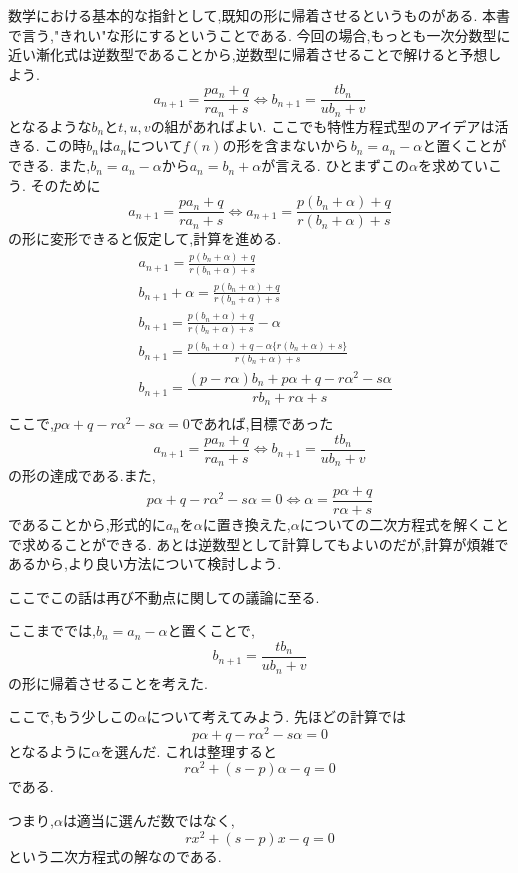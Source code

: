     数学における基本的な指針として,既知の形に帰着させるというものがある.
    本書で言う,"きれい"な形にするということである.
    今回の場合,もっとも一次分数型に近い漸化式は逆数型であることから,逆数型に帰着させることで解けると予想しよう.
    \[
      a_{n+1}=\frac{pa_n+q}{ra_n+s} \Leftrightarrow b_{n+1}=\frac{tb_n}{u b_n+v} 
    \]
    となるような$b_n$と$t,u,v$の組があればよい.
    ここでも特性方程式型のアイデアは活きる.
    この時$b_n$は$a_n$について$f(n)$の形を含まないから\,$b_n=a_n-\alpha$と置くことができる. 
    また,$b_n=a_n-\alpha$から$a_n=b_n+\alpha$が言える.
    ひとまずこの$\alpha$を求めていこう.
    そのために
    \[
      a_{n+1}=\frac{pa_n+q}{ra_n+s} \Leftrightarrow a_{n+1}=\frac{p(b_n+\alpha)+q}{r(b_n+\alpha)+s}
    \]
    の形に変形できると仮定して,計算を進める.
    \begin{align*}
      &a_{n+1}=\frac{p(b_n+\alpha)+q}{r(b_n+\alpha)+s}\\
      &b_{n+1}+\alpha=\frac{p(b_n+\alpha)+q}{r(b_n+\alpha)+s}\\
      &b_{n+1}=\frac{p(b_n+\alpha)+q}{r(b_n+\alpha)+s}-\alpha\\
      &b_{n+1}=\frac{p(b_n+\alpha)+q-\alpha\{r(b_n+\alpha)+s\}}{r(b_n+\alpha)+s}\\
      &b_{n+1}=\dfrac{(p-r\alpha)b_{n}+p\alpha+q-r\alpha^{2}-s\alpha}{rb_{n}+r\alpha+s}\\
    \end{align*}
    ここで,$p\alpha+q-r\alpha^{2}-s\alpha=0$であれば,目標であった
    \[
      a_{n+1}=\frac{pa_n+q}{ra_n+s} \Leftrightarrow b_{n+1}=\frac{tb_n}{u b_n+v} 
    \]
    の形の達成である.また,
    \[
      p\alpha+q-r\alpha^{2}-s\alpha=0 \Leftrightarrow \alpha=\frac{p\alpha+q}{r\alpha+s}
    \]
    であることから,形式的に$a_n$を$\alpha$に置き換えた,$\alpha$についての二次方程式を解くことで求めることができる.
    あとは逆数型として計算してもよいのだが,計算が煩雑であるから,より良い方法について検討しよう.

    ここでこの話は再び不動点に関しての議論に至る.

    ここまででは,$b_n=a_n-\alpha$と置くことで,
    \[
      b_{n+1}=\frac{tb_n}{ub_n+v}
    \]
    の形に帰着させることを考えた.
    
    ここで,もう少しこの$\alpha$について考えてみよう.
    先ほどの計算では
    \[
      p\alpha+q-r\alpha^2-s\alpha=0
    \]
    となるように$\alpha$を選んだ.
    これは整理すると
    \[
      r\alpha^2+(s-p)\alpha-q=0
    \]
    である.
    
    つまり,$\alpha$は適当に選んだ数ではなく,
    \[
      rx^2+(s-p)x-q=0
    \]
    という二次方程式の解なのである.
    
